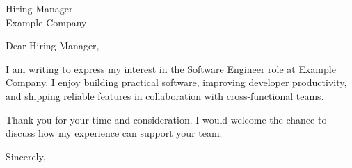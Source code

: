 \documentclass[11pt]{letter}
\begin{document}
\begin{letter}{Hiring Manager \\ Example Company}
\opening{Dear Hiring Manager,}

I am writing to express my interest in the Software Engineer role at Example Company.
I enjoy building practical software, improving developer productivity, and shipping
reliable features in collaboration with cross-functional teams.

Thank you for your time and consideration. I would welcome the chance to discuss
how my experience can support your team.

\closing{Sincerely,}
\end{letter}
\end{document}
